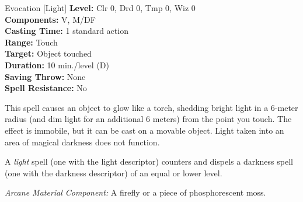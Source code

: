 {Evocation [Light]}
{
	\textbf{Level:}
	Clr 0, Drd 0, Tmp 0, Wiz 0\\
	\textbf{Components:}
	V, M/DF\\
	\textbf{Casting Time:}
	1 standard action\\
	\textbf{Range:}
	Touch\\
	\textbf{Target:}
	Object touched\\
	\textbf{Duration:}
	10 min./level (D)\\
	\textbf{Saving Throw:}
	None\\
	\textbf{Spell Resistance:}
	No\\
}
{
	This spell causes an object to glow like a torch, shedding bright light in a 6-meter radius (and dim light for an additional 6 meters) from the point you touch. The effect is immobile, but it can be cast on a movable object. Light taken into an area of magical darkness does not function.

	A \emph{light} spell (one with the light descriptor) counters and dispels a darkness spell (one with the darkness descriptor) of an equal or lower level.

	\textit{Arcane Material Component:}
	A firefly or a piece of phosphorescent moss.

}

